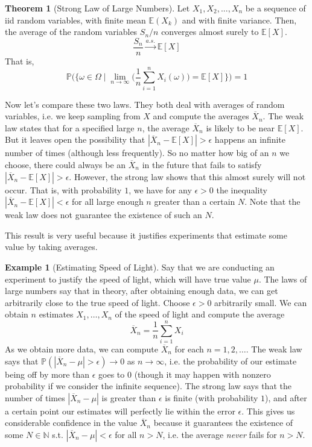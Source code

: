 \documentclass{article}
\theoremstyle{definition}
\newtheorem{theorem}{Theorem}[section]
\newtheorem{example}{Example}[section]
\theoremstyle{remark}
\theoremstyle{definition}
\begin{document}
\begin{theorem}[Strong Law of Large Numbers]
Let $X_1, X_2, ..., X_n$ be a sequence of iid random variables, with finite mean $\mathbb{E}(X_k)$ and with finite variance. Then, the average of the random variables $S_n / n$ converges almost surely to $\mathbb{E}[X]$. 
\[\frac{S_n}{n} \xrightarrow{a.s.} \mathbb{E}[X]\]
That is, 
\[\mathbb{P} \bigg( \Big\{ \omega \in \Omega \mid \lim_{n \rightarrow \infty} \Big( \frac{1}{n} \sum_{i=1}^n X_i (\omega) \Big) = \mathbb{E}[X] \Big\} \bigg) = 1\]
\end{theorem}

Now let's compare these two laws. They both deal with averages of random variables, i.e. we keep sampling from $X$ and compute the averages $\overline{X}_n$. The weak law states that for a specified large $n$, the average $\overline{X}_n$ is likely to be near $\mathbb{E}[X]$. But it leaves open the possibility that $|\overline{X}_n - \mathbb{E}[X]| > \epsilon$ happens an infinite number of times (although less frequently). So no matter how big of an $n$ we choose, there could always be an $\overline{X}_n$ in the future that fails to satisfy $|\overline{X}_n - \mathbb{E}[X]| > \epsilon$. However, the strong law shows that this almost surely will not occur. That is, with probability $1$, we have for any $\epsilon > 0$ the inequality $|\overline{X}_n - \mathbb{E}[X]| < \epsilon$ for all large enough $n$ greater than a certain $N$. Note that the weak law does not guarantee the existence of such an $N$. 

This result is very useful because it justifies experiments that estimate some value by taking averages. 

\begin{example}[Estimating Speed of Light]
Say that we are conducting an experiment to justify the speed of light, which will have true value $\mu$. The laws of large numbers say that in theory, after obtaining enough data, we can get arbitrarily close to the true speed of light. Choose $\epsilon > 0$ arbitrarily small. We can obtain $n$ estimates $X_1, \ldots, X_n$ of the speed of light and compute the average 
\[\overline{X}_n = \frac{1}{n} \sum_{i=1}^n X_i\] 
As we obtain more data, we can compute $\overline{X}_n$ for each $n = 1, 2, \ldots$. The weak law says that $\mathbb{P}(|\overline{X}_n - \mu| > \epsilon) \rightarrow 0$ as $n \rightarrow \infty$, i.e. the probability of our estimate being off by more than $\epsilon$ goes to $0$ (though it may happen with nonzero probability if we consider the infinite sequence). The strong law says that the number of times $|\overline{X}_n - \mu|$ is greater than $\epsilon$ is finite (with probability $1$), and after a certain point our estimates will perfectly lie within the error $\epsilon$. This gives us considerable confidence in the value $\overline{X}_n$ because it guarantees the existence of some $N \in \mathbb{N}$ s.t. $|\overline{X}_n - \mu| < \epsilon$ for all $n > N$, i.e. the average \textit{never} fails for $n > N$. 
\end{example}
\end{document}

